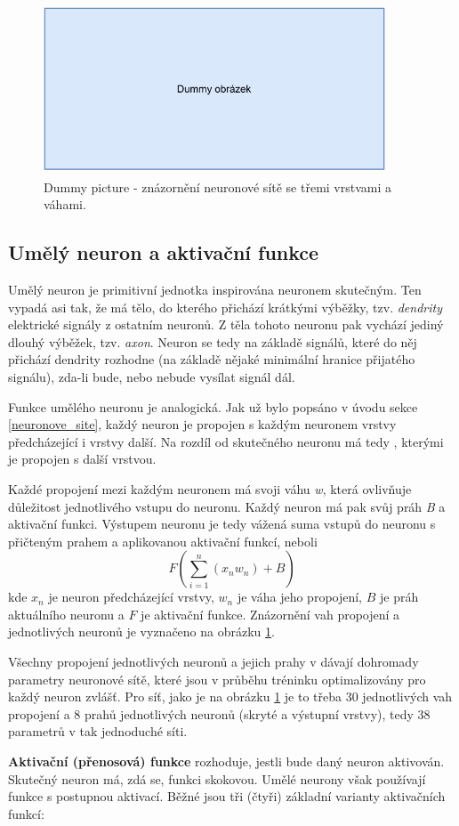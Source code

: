\begin{figure}[hbt]
	\centering
	\includegraphics[width=4.0in, height=2in]{obrazky/dummy_pic.pdf}
	\caption{Dummy picture - znázornění neuronové sítě se třemi vrstvami a váhami.}
	\label{three_layers}
\end{figure}

\subsection{Umělý neuron a aktivační funkce}
Umělý neuron je primitivní jednotka inspirována neuronem skutečným. Ten vypadá asi tak, že má tělo, do kterého přichází krátkými výběžky, tzv. \emph{dendrity} elektrické signály z ostatním neuronů. Z těla tohoto neuronu pak vychází jediný dlouhý výběžek, tzv. \emph{axon}. Neuron se tedy na základě signálů, které do něj přichází dendrity rozhodne (na základě nějaké minimální hranice přijatého signálu), zda-li bude, nebo nebude vysílat signál dál\cite{wiki:neuron}.\par
Funkce umělého neuronu je analogická. Jak už bylo popsáno v úvodu sekce \ref{neuronove_site}, každý neuron je propojen s každým neuronem vrstvy předcházející i vrstvy další. Na rozdíl od skutečného neuronu má tedy , kterými je propojen s další vrstvou.\par
Každé propojení mezi každým neuronem má svoji váhu \emph{w}, která ovlivňuje důležitost jednotlivého vstupu do neuronu. Každý neuron má pak svůj práh \emph{B} a aktivační funkci. Výstupem neuronu je tedy vážená suma vstupů do neuronu s přičteným prahem a aplikovanou aktivační funkcí, neboli 
$$F({\sum_{i=1}^n ({x_n}w_n)} + B)$$
kde $x_n$ je neuron předcházející vrstvy, $w_n$ je váha jeho propojení, $B$ je práh aktuálního neuronu a $F$ je aktivační funkce. Znázornění vah propojení a jednotlivých neuronů je vyznačeno na obrázku \ref{three_layers}.\par
Všechny propojení jednotlivých neuronů a jejich prahy v dávají dohromady parametry neuronové sítě, které jsou v průběhu tréninku optimalizovány pro každý neuron zvlášť. Pro síť, jako je na obrázku \ref{three_layers} je to třeba 30 jednotlivých vah propojení a 8 prahů jednotlivých neuronů (skryté a výstupní vrstvy), tedy 38 parametrů v tak jednoduché síti.\par
\textbf{Aktivační (přenosová) funkce} rozhoduje, jestli bude daný neuron aktivován. Skutečný neuron má, zdá se, funkci skokovou. Umělé neurony však používají funkce s postupnou aktivací. Běžné jsou tři (čtyři) základní varianty aktivačních funkcí: 

